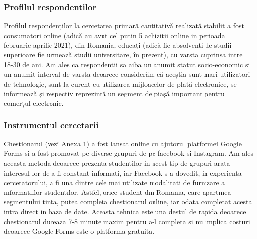 \documentclass[a4paper, 12pt]{article}
\begin{document}
	\subsubsection{Profilul respondentilor}
	\qquad Profilul respondenților la cercetarea primară cantitativă realizată stabilit a fost consumatori online (adică au avut cel putin 5 achizitii online in perioada februarie-aprilie 2021), din Romania, educați (adică fie absolvenți de studii superioare fie urmează studii universitare, în prezent), cu varsta cuprinsa intre 18-30 de ani. Am ales ca respondentii sa aiba un anumit statut socio-economic si un anumit interval de varsta deoarece considerăm că aceștia sunt mari utilizatori de tehnologie, sunt la curent cu utilizarea mijloacelor de plată electronice, se informează și respectiv reprezintă un segment de piașă important pentru comerțul electronic.
	\subsubsection{Instrumentul cercetarii}
		\qquad  Chestionarul (vezi Anexa 1) a fost lansat online cu ajutorul platformei Google Forms si a fost promovat  pe diverse grupuri de pe facebook si Instagram. Am ales aceasta metoda deoarece prezenta studentilor in acest tip de grupuri arata interesul lor de a fi constant informati, iar Facebook s-a dovedit, in experienta cercetatorului, a fi una dintre cele mai utilizate modalitati de furnizare a informatiilor studentilor. Astfel, orice student din Romania, care apartinea segmentului tinta, putea completa chestionarul online, iar odata completat acesta intra direct in baza de date. Aceasta tehnica este una destul de rapida deoarece chestionarul dureaza 7-8 minute maxim pentru a-l completa si nu implica costuri deoarece Google Forms este o platforma gratuita.
\end{document}
